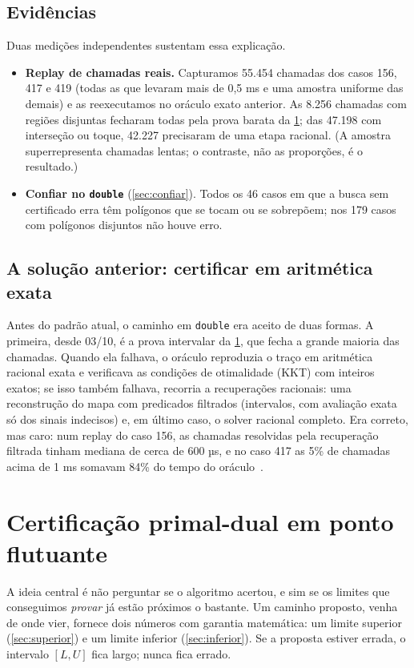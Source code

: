 \documentclass[11pt,a4paper]{article}
\theoremstyle{plain}\newtheorem{proposicao}{Proposição}
\theoremstyle{definition}\newtheorem{definicao}{Definição}
\theoremstyle{plain}\newtheorem{teorema}{Teorema}
\begin{document}
\subsection{Evidências}\label{sec:evidencias}
Duas medições independentes sustentam essa explicação.
\begin{itemize}[leftmargin=*,itemsep=2pt]
\item \textbf{Replay de chamadas reais.} Capturamos 55.454 chamadas dos casos 156, 417 e 419 (todas as que levaram mais de 0,5 ms e uma amostra uniforme das demais) e as reexecutamos no oráculo exato anterior. As 8.256 chamadas com regiões disjuntas fecharam todas pela prova barata da \cref{sec:certificado}; das 47.198 com interseção ou toque, 42.227 precisaram de uma etapa racional. (A amostra superrepresenta chamadas lentas; o contraste, não as proporções, é o resultado.)
\item \textbf{Confiar no \texttt{double}} (\cref{sec:confiar}). Todos os 46 casos em que a busca sem certificado erra têm polígonos que se tocam ou se sobrepõem; nos 179 casos com polígonos disjuntos não houve erro.
\end{itemize}

\subsection{A solução anterior: certificar em aritmética exata}
Antes do padrão atual, o caminho em \texttt{double} era aceito de duas formas. A primeira, desde 03/10, é a prova intervalar da \cref{sec:certificado}, que fecha a grande maioria das chamadas. Quando ela falhava, o oráculo reproduzia o traço em aritmética racional exata e verificava as condições de otimalidade (KKT) com inteiros exatos; se isso também falhava, recorria a recuperações racionais: uma reconstrução do mapa com predicados filtrados (intervalos, com avaliação exata só dos sinais indecisos) e, em último caso, o solver racional completo. Era correto, mas caro: num replay do caso 156, as chamadas resolvidas pela recuperação filtrada tinham mediana de cerca de 600 µs, e no caso 417 as 5\% de chamadas acima de 1 ms somavam 84\% do tempo do oráculo~\cite{experimentos}.

\section{Certificação primal-dual em ponto flutuante}\label{sec:certificado}
A ideia central é não perguntar se o algoritmo acertou, e sim se os limites que conseguimos \emph{provar} já estão próximos o bastante. Um caminho proposto, venha de onde vier, fornece dois números com garantia matemática: um limite superior (\cref{sec:superior}) e um limite inferior (\cref{sec:inferior}). Se a proposta estiver errada, o intervalo \([L,U]\) fica largo; nunca fica errado.
\end{document}
